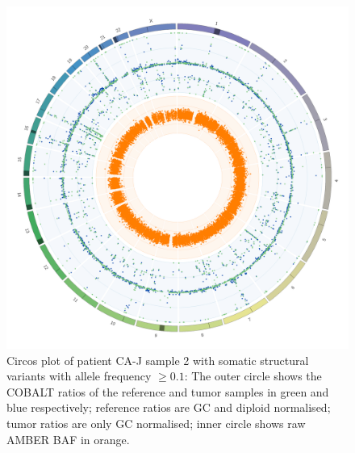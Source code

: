 \begin{figure}[htp]
\centering
\includegraphics[width=.99\linewidth]{Figures/CASCADE/CA80/CA80-2.input.png}
\caption[Circos input plot of patient CA-J sample 2]{Circos plot of patient CA-J sample 2 with somatic structural variants with allele frequency $\geq 0.1$: The outer circle shows the COBALT ratios of the reference and tumor samples in green and blue respectively; reference ratios are GC and diploid normalised; tumor ratios are only GC normalised; inner circle shows raw AMBER BAF in orange.} \label{fig:ca80.2input}
\end{figure}


